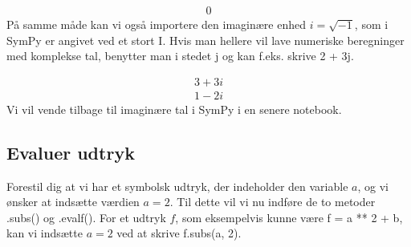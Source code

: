 \documentclass[letterpaper,10pt,english]{jupyterBook}
\begin{document}
\begin{sphinxVerbatim}[commandchars=\\\{\}]
    
                 
\end{sphinxVerbatim}
\begin{equation*}
\begin{split}\displaystyle 0\end{split}
\end{equation*}
På samme måde kan vi også importere den imaginære enhed \(i = \sqrt{-1}\), som i SymPy er angivet ved et stort I. Hvis man hellere vil lave numeriske beregninger med komplekse tal, benytter man i stedet j og kan f.eks. skrive 2 + 3j. 

\begin{sphinxVerbatim}[commandchars=\\\{\}]
    
             
      
        
\end{sphinxVerbatim}
\begin{equation*}
\begin{split}\displaystyle 3 + 3 i\end{split}
\end{equation*}\begin{equation*}
\begin{split}\displaystyle 1 - 2 i\end{split}
\end{equation*}
Vi vil vende tilbage til imaginære tal i SymPy i en senere notebook.


\subsection{Evaluer udtryk}
\label{\detokenize{notebooks/sympy/Notebook2:evaluer-udtryk}}
Forestil dig at vi har et symbolsk udtryk, der indeholder den variable \(a\), og vi ønsker at indsætte værdien \(a = 2\). Til dette vil vi nu indføre de to metoder .subs() og .evalf(). For et udtryk \(f\), som eksempelvis kunne være f = a ** 2 + b, kan vi indsætte \(a = 2\) ved at skrive f.subs(a, 2).
\end{document}
